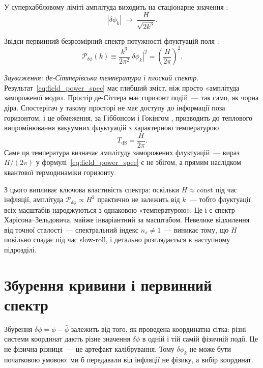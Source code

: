 У суперхаббловому ліміті амплітуда виходить на стаціонарне
значення \cite{guth_pi_1982}:
\begin{equation*}
  |\delta\phi_k| \;\to\; \frac{H}{\sqrt{2k^3}}.
\end{equation*}

Звідси первинний безрозмірний спектр потужності флуктуацій поля
\cite{mukhanov_chibisov_1981}:
\begin{equation}\label{eq:field_power_spec}
  \mathcal{P}_{\delta\phi}(k)
    \equiv \frac{k^3}{2\pi^2}|\delta\phi_k|^2
    = \left(\frac{H}{2\pi}\right)^{\!2}.
\end{equation}

\textit{Зауваження: де-Сіттерівська температура і плоский спектр.}
Результат~\eqref{eq:field_power_spec} має глибший зміст, ніж
просто «амплітуда замороженої моди». Простір де-Сіттера має
горизонт подій~--- так само, як чорна діра. Спостерігач у такому
просторі не має доступу до інформації поза горизонтом, і це
обмеження, за Гіббонсом і Гокінгом \cite{gibbons_hawking_1977},
призводить до теплового випромінювання вакуумних флуктуацій з
характерною температурою
\begin{equation*}
  T_\mathrm{dS} = \frac{H}{2\pi}.
\end{equation*}
Саме ця температура визначає амплітуду заморожених флуктуацій~---
вираз $H/(2\pi)$ у формулі~\eqref{eq:field_power_spec} є не
збігом, а прямим наслідком квантової термодинаміки горизонту.

З цього випливає ключова властивість спектра: оскільки $H \approx
\mathrm{const}$ під час інфляції, амплітуда $\mathcal{P}_{\delta\phi}
\propto H^2$ практично не залежить від $k$~--- тобто флуктуації
всіх масштабів народжуються з однаковою «температурою».
Це і є спектр Харісона--Зельдовича, майже інваріантний за
масштабом. Невелике відхилення від точної сталості~---
спектральний індекс $n_s \neq 1$~--- виникає тому, що $H$
повільно спадає під час slow-roll, і детально розглядається
в наступному підрозділі.

\section{Збурення кривини і первинний спектр}

Збурення $\delta\phi = \phi - \bar\phi$ залежить від того, як
проведена координатна сітка: різні системи координат дають різне
значення $\delta\phi$ в одній і тій самій фізичній події.
Це не фізична різниця~--- це артефакт калібрування.
Тому $\delta\phi_k$ не може бути початковою умовою:
ми б передавали від інфляції не фізику, а вибір координат.

